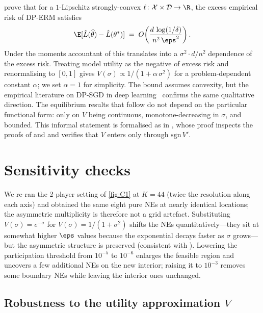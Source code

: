 \citet{bassily2014private} prove that for a $1$-Lipschitz strongly-convex
$\ell\colon \mathcal{X} \times \mathcal{D} \to \R$, the excess empirical
risk of DP-ERM satisfies
\[
\E[\hat L(\widehat\theta) - \hat L(\theta^*)]
\;=\; O\!\left(\frac{d\,\log(1/\delta)}{n^2\,\eps^2}\right).
\]
Under the moments accountant of \citet{abadi2016deep} this translates into
a $\sigma^2 \cdot d / n^2$ dependence of the excess risk. Treating model
utility as the negative of excess risk and renormalising to $[0, 1]$
gives $V(\sigma) \propto 1/(1 + \alpha\,\sigma^2)$ for a problem-dependent
constant $\alpha$; we set $\alpha = 1$ for simplicity. The bound assumes
convexity, but the empirical literature on DP-SGD in deep
learning~\cite{tramer2021private, abadi2016deep, boenisch2023have} confirms
the same qualitative direction. The equilibrium results that follow do
not depend on the particular functional form: only on $V$ being
continuous, monotone-decreasing in $\sigma$, and bounded. This informal
statement is formalised as  in
, whose proof inspects the proofs of
 and  and verifies
that $V$ enters only through $\mathrm{sgn}\,V'$.

\section{Sensitivity checks}
\label{app:sensitivity}

We re-ran the 2-player setting of \cref{fig:C1} at $K = 44$ (twice the
resolution along each axis) and obtained the same eight pure NEs at
nearly identical locations; the asymmetric multiplicity is therefore not
a grid artefact. Substituting $V(\sigma) = e^{-\sigma}$ for $V(\sigma) =
1/(1+\sigma^2)$ shifts the NEs quantitatively---they sit at somewhat
higher $\eps$ values because the exponential decays faster as $\sigma$
grows---but the asymmetric structure is preserved (consistent with
). Lowering the
participation threshold from $10^{-5}$ to $10^{-6}$ enlarges the feasible
region and uncovers a few additional NEs on the new interior; raising
it to $10^{-3}$ removes some boundary NEs while leaving the
interior ones unchanged.

\subsection{Robustness to the utility approximation $V$}
\label{app:v-shape-robustness}

